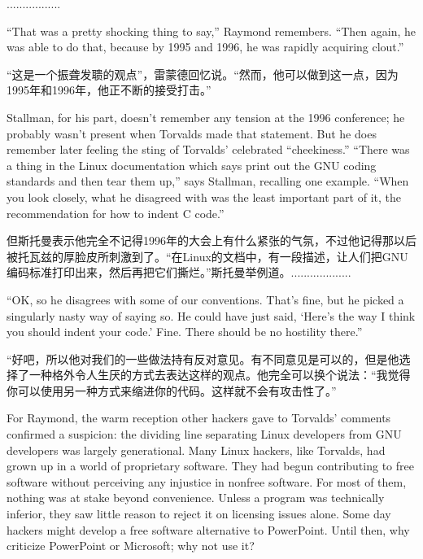 \ifdefined\chs
.................
\fi

\ifdefined\eng
``That was a pretty shocking thing to say,'' Raymond remembers. ``Then again, he was able to do that, because by 1995 and 1996, he was rapidly acquiring clout.''
\fi

\ifdefined\chs
“这是一个振聋发聩的观点”，雷蒙德回忆说。“然而，他可以做到这一点，因为1995年和1996年，他正不断的接受打击。”
\fi

\ifdefined\eng
Stallman, for his part, doesn't remember any tension at the 1996 conference; he probably wasn't present when Torvalds made that statement.  But he does remember later feeling the sting of Torvalds' celebrated ``cheekiness.'' ``There was a thing in the Linux documentation which says print out the GNU coding standards and then tear them up,'' says Stallman, recalling one example. ``When you look closely, what he disagreed with was the least important part of it, the recommendation for how to indent C code.''
\fi

\ifdefined\chs
但斯托曼表示他完全不记得1996年的大会上有什么紧张的气氛，不过他记得那以后被托瓦兹的厚脸皮所刺激到了。“在Linux的文档中，有一段描述，让人们把GNU编码标准打印出来，然后再把它们撕烂。”斯托曼举例道。...................
\fi

\ifdefined\eng
``OK, so he disagrees with some of our conventions. That's fine, but he picked a singularly nasty way of saying so. He could have just said, `Here's the way I think you should indent your code.' Fine. There should be no hostility there.''
\fi

\ifdefined\chs
“好吧，所以他对我们的一些做法持有反对意见。有不同意见是可以的，但是他选择了一种格外令人生厌的方式去表达这样的观点。他完全可以换个说法：“我觉得你可以使用另一种方式来缩进你的代码。这样就不会有攻击性了。”
\fi

\ifdefined\eng
For Raymond, the warm reception other hackers gave to Torvalds' comments confirmed a suspicion: the dividing line separating Linux developers from GNU developers was largely generational. Many Linux hackers, like Torvalds, had grown up in a world of proprietary software. They had begun contributing to free software without perceiving any injustice in nonfree software.  For most of them, nothing was at stake beyond convenience.  Unless a program was technically inferior, they saw little reason to reject it on licensing issues alone. Some day hackers might develop a free software alternative to PowerPoint. Until then, why criticize PowerPoint or Microsoft; why not use it?
\fi

